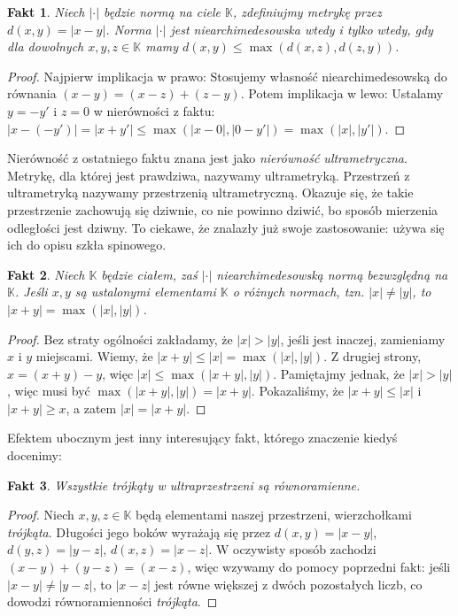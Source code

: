 \documentclass[a4paper,fleqn,9pt]{extarticle}
\newtheorem{fkt}{Fakt}
\begin{document}
\begin{fkt}Niech $|\cdot|$ będzie normą na ciele $\mathbb K$, zdefiniujmy metrykę przez $d(x,y) = |x-y|$. Norma $|\cdot|$ jest niearchimedesowska wtedy i tylko wtedy, gdy dla dowolnych $x,y,z\in\mathbb K$ mamy $d(x,y) \le \max(d(x,z), d(z,y))$.\end{fkt}

\begin{proof}Najpierw implikacja w prawo: Stosujemy własność niearchimedesowską do równania $(x-y) = (x-z) + (z-y)$. Potem implikacja w lewo: Ustalamy $y = -y'$ i $z=0$ w nierówności z faktu: $|x- (-y')| = |x+y'| \le \max (|x-0|, |0-y'|) = \max (|x|, |y'|)$.\end{proof}

Nierówność z ostatniego faktu znana jest jako \emph{nierówność ultrametryczna}. Metrykę, dla której jest prawdziwa, nazywamy ultrametryką. Przestrzeń z ultrametryką nazywamy przestrzenią ultrametryczną. Okazuje się, że takie przestrzenie zachowują się dziwnie, co nie powinno dziwić, bo sposób mierzenia odległości jest dziwny. To ciekawe, że znalazły już swoje zastosowanie: używa się ich do opisu szkła spinowego.

\begin{fkt}Niech $\mathbb K$ będzie ciałem, zaś $|\cdot|$ niearchimedesowską normą bezwzględną na $\mathbb K$. Jeśli $x,y$ są ustalonymi elementami $\mathbb K$ o różnych normach, tzn. $|x| \neq |y|$, to $|x+y| = \max(|x|, |y|)$.\end{fkt}

\begin{proof}Bez straty ogólności zakładamy, że $|x| > |y|$, jeśli jest inaczej, zamieniamy $x$ i $y$ miejscami. Wiemy, że $|x+y| \le |x| = \max(|x|, |y|)$. Z drugiej strony, $x = (x+y) - y$, więc $|x| \le \max(|x+y|, |y|)$. Pamiętajmy jednak, że $|x| > |y|$, więc musi być $\max(|x+y|, |y|) = |x+y|$. Pokazaliśmy, że $|x+y| \le |x|$ i $|x+y| \ge x$, a zatem $|x| = |x+y|$.\end{proof}

Efektem ubocznym jest inny interesujący fakt, którego znaczenie kiedyś docenimy:

\begin{fkt}Wszystkie \emph{trójkąty} w ultraprzestrzeni są równoramienne.\end{fkt}

\begin{proof}Niech $x,y,z\in\mathbb K$ będą elementami naszej przestrzeni, wierzchołkami \emph{trójkąta}. Długości jego boków wyrażają się przez $d(x,y) = |x-y|$, $d(y,z) = |y-z|$, $d(x,z) = |x-z|$. W oczywisty sposób zachodzi $(x-y) + (y-z) = (x-z)$, więc wzywamy do pomocy poprzedni fakt: jeśli $|x-y| \neq |y-z|$, to $|x-z|$ jest równe większej z dwóch pozostałych liczb, co dowodzi równoramienności \emph{trójkąta}. \end{proof}
\end{document}
